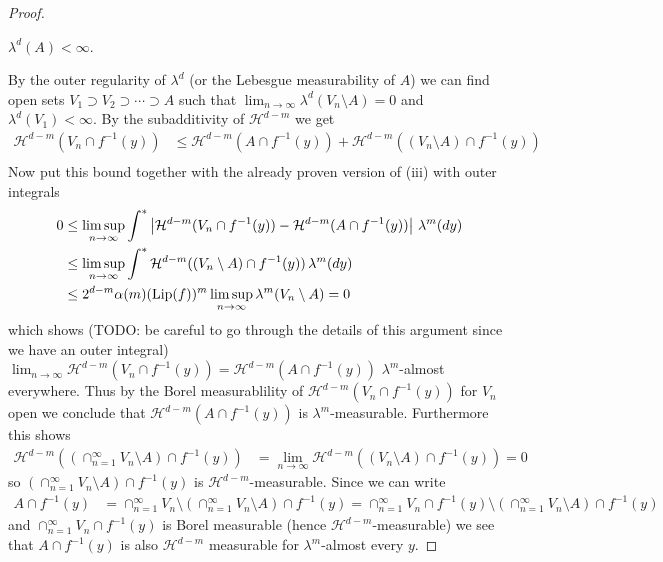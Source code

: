 \begin{proof}
\begin{cas} $\lambda^d(A) < \infty$.
\end{cas}
By the outer regularity of $\lambda^d$ (or the Lebesgue measurability of $A$) we can find open sets $V_1 \supset V_2 \supset \dotsb \supset A$ such that
$\lim_{n \to \infty} \lambda^d(V_n \setminus A) = 0$ and $\lambda^d(V_1) < \infty$.  By the subadditivity of $\mathcal{H}^{d-m}$ we get
\begin{align*}
\mathcal{H}^{d-m}(V_n \cap f^{-1}(y)) 
&\leq 
\mathcal{H}^{d-m}(A \cap f^{-1}(y)) +
\mathcal{H}^{d-m}((V_n \setminus A) \cap f^{-1}(y)) \\
\end{align*}
Now put this bound together with the already proven version of (iii) with outer integrals
\begin{align*}
0 &\leq \limsup_{n \to \infty} \int^* \left \vert \mathcal{H}^{d-m}(V_n \cap f^{-1}(y))  - \mathcal{H}^{d-m}(A \cap f^{-1}(y)) \right \vert \, \lambda^m(dy) \\
&\leq \limsup_{n \to \infty} \int^* \mathcal{H}^{d-m}((V_n \setminus A) \cap f^{-1}(y)) \, \lambda^m(dy) \\
&\leq 2^{d-m} \alpha(m) (\operatorname*{Lip}(f))^m \limsup_{n \to \infty} \lambda^m(V_n \setminus A) = 0\\
\end{align*}
which shows (TODO: be careful to go through the details of this argument since we have an outer integral) $\lim_{n \to \infty} \mathcal{H}^{d-m}(V_n \cap f^{-1}(y)) = \mathcal{H}^{d-m}(A \cap f^{-1}(y))$
$\lambda^m$-almost everywhere.  Thus by the Borel measurablility of $\mathcal{H}^{d-m}(V_n \cap f^{-1}(y))$ for $V_n$ open we conclude that $\mathcal{H}^{d-m}(A \cap f^{-1}(y))$ is $\lambda^m$-measurable.  Furthermore this shows 
\begin{align*}
\mathcal{H}^{d-m}((\cap_{n=1}^\infty V_n \setminus A) \cap f^{-1}(y)) &= \lim_{n \to \infty} \mathcal{H}^{d-m}((V_n \setminus A) \cap f^{-1}(y)) = 0
\end{align*} 
so $(\cap_{n=1}^\infty V_n \setminus A) \cap f^{-1}(y)$ is $\mathcal{H}^{d-m}$-measurable.
Since we can write 
\begin{align*}
A \cap f^{-1}(y) &= \cap_{n=1}^\infty V_n \setminus (\cap_{n=1}^\infty V_n  \setminus A) \cap f^{-1}(y) = 
\cap_{n=1}^\infty V_n \cap f^{-1}(y) \setminus (\cap_{n=1}^\infty V_n  \setminus A) \cap f^{-1}(y)
\end{align*}
and $\cap_{n=1}^\infty V_n \cap f^{-1}(y)$ is Borel measurable (hence $\mathcal{H}^{d-m}$-measurable) we see that $A \cap f^{-1}(y)$ is also $\mathcal{H}^{d-m}$ measurable for $\lambda^m$-almost every $y$.


\end{proof}
